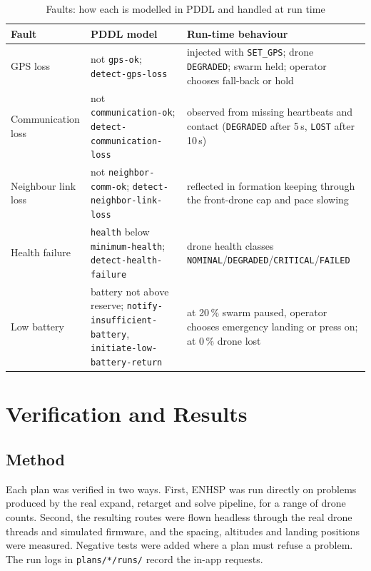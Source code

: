 \documentclass[11pt,a4paper,oneside]{report}
\newcommand{\code}[1]{\texttt{#1}}
\begin{document}
\begin{table}[H]
\caption{Faults: how each is modelled in PDDL and handled at run time}\label{tab:faultmap}
\small
\begin{tabularx}{\textwidth}{@{}P{0.17\textwidth}P{0.32\textwidth}Y@{}}
\toprule
\textbf{Fault} & \textbf{PDDL model} & \textbf{Run-time behaviour} \\
\midrule
GPS loss & not \code{gps-ok}; \code{detect-gps-loss} & injected with \code{SET\_GPS}; drone
\code{DEGRADED}; swarm held; operator chooses fall-back or hold \\
Communication loss & not \code{communication-ok}; \code{detect-communication-loss} & observed
from missing heartbeats and contact (\code{DEGRADED} after 5\,s, \code{LOST} after 10\,s) \\
Neighbour link loss & not \code{neighbor-comm-ok}; \code{detect-neighbor-link-loss} & reflected
in formation keeping through the front-drone cap and pace slowing \\
Health failure & \code{health} below \code{minimum-health}; \code{detect-health-failure} &
drone health classes \code{NOMINAL}/\code{DEGRADED}/\code{CRITICAL}/\code{FAILED} \\
Low battery & battery not above reserve; \code{notify-insufficient-battery},
\code{initiate-low-battery-return} & at 20\,\% swarm paused, operator chooses emergency landing
or press on; at 0\,\% drone lost \\
\bottomrule
\end{tabularx}
\end{table}

\chapter{Verification and Results}\label{ch:results}

\section{Method}
Each plan was verified in two ways. First, ENHSP was run directly on problems produced by the real
expand, retarget and solve pipeline, for a range of drone counts. Second, the resulting routes were
flown headless through the real drone threads and simulated firmware, and the spacing, altitudes
and landing positions were measured. Negative tests were added where a plan must refuse a
problem. The run logs in \code{plans/*/runs/} record the in-app requests.
\end{document}
